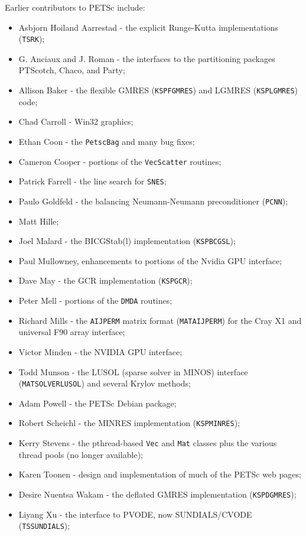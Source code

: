 \noindent 
Earlier contributors to PETSc include:
\begin{itemize}
  \item Asbjorn Hoiland Aarrestad - the explicit Runge-Kutta implementations (\lstinline{TSRK});
  \item G. Anciaux and J. Roman - the interfaces to the partitioning packages PTScotch, Chaco, and Party;
  \item Allison Baker - the flexible GMRES (\lstinline{KSPFGMRES}) and LGMRES (\lstinline{KSPLGMRES}) code;
  \item Chad Carroll - Win32 graphics;
  \item Ethan Coon - the \lstinline{PetscBag} and many bug fixes;
  \item Cameron Cooper - portions of the \lstinline{VecScatter} routines;
  \item Patrick Farrell - the  line search for \lstinline{SNES};
  \item Paulo Goldfeld - the balancing Neumann-Neumann preconditioner (\lstinline{PCNN});
  \item Matt Hille;
  \item Joel Malard - the BICGStab(l) implementation (\lstinline{KSPBCGSL});
  \item Paul Mullowney, enhancements to portions of the Nvidia GPU interface;
  \item Dave May - the GCR implementation (\lstinline{KSPGCR});
  \item Peter Mell - portions of the \lstinline{DMDA} routines;
  \item Richard Mills - the \lstinline{AIJPERM} matrix format (\lstinline{MATAIJPERM}) for the Cray X1 and universal F90 array interface;
  \item Victor Minden - the NVIDIA GPU interface;
  \item Todd Munson - the LUSOL (sparse solver in MINOS) interface (\lstinline{MATSOLVERLUSOL}) and several Krylov methods;
  \item Adam Powell - the PETSc Debian package;
  \item Robert Scheichl - the MINRES implementation (\lstinline{KSPMINRES});
  \item Kerry Stevens - the pthread-based \lstinline{Vec} and \lstinline{Mat} classes plus the various thread pools (no longer available);
  \item Karen Toonen - design and implementation of much of the PETSc web pages;
  \item Desire Nuentsa Wakam - the deflated GMRES implementation (\lstinline{KSPDGMRES});
  \item Liyang Xu - the interface to PVODE, now SUNDIALS/CVODE (\lstinline{TSSUNDIALS});
\end{itemize}

